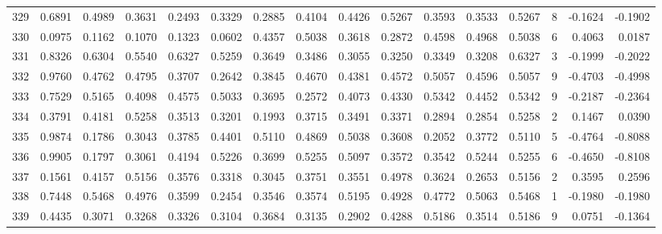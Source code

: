 \begin{tabular}{lrrrrrrrrrrrrrrr}
329 &      0.6891 &  0.4989 &  0.3631 &  0.2493 &  0.3329 &  0.2885 &  0.4104 &  0.4426 &  0.5267 &  0.3593 &   0.3533 &     0.5267 &      8 &                   -0.1624 &                    -0.1902 \\
330 &      0.0975 &  0.1162 &  0.1070 &  0.1323 &  0.0602 &  0.4357 &  0.5038 &  0.3618 &  0.2872 &  0.4598 &   0.4968 &     0.5038 &      6 &                    0.4063 &                     0.0187 \\
331 &      0.8326 &  0.6304 &  0.5540 &  0.6327 &  0.5259 &  0.3649 &  0.3486 &  0.3055 &  0.3250 &  0.3349 &   0.3208 &     0.6327 &      3 &                   -0.1999 &                    -0.2022 \\
332 &      0.9760 &  0.4762 &  0.4795 &  0.3707 &  0.2642 &  0.3845 &  0.4670 &  0.4381 &  0.4572 &  0.5057 &   0.4596 &     0.5057 &      9 &                   -0.4703 &                    -0.4998 \\
333 &      0.7529 &  0.5165 &  0.4098 &  0.4575 &  0.5033 &  0.3695 &  0.2572 &  0.4073 &  0.4330 &  0.5342 &   0.4452 &     0.5342 &      9 &                   -0.2187 &                    -0.2364 \\
334 &      0.3791 &  0.4181 &  0.5258 &  0.3513 &  0.3201 &  0.1993 &  0.3715 &  0.3491 &  0.3371 &  0.2894 &   0.2854 &     0.5258 &      2 &                    0.1467 &                     0.0390 \\
335 &      0.9874 &  0.1786 &  0.3043 &  0.3785 &  0.4401 &  0.5110 &  0.4869 &  0.5038 &  0.3608 &  0.2052 &   0.3772 &     0.5110 &      5 &                   -0.4764 &                    -0.8088 \\
336 &      0.9905 &  0.1797 &  0.3061 &  0.4194 &  0.5226 &  0.3699 &  0.5255 &  0.5097 &  0.3572 &  0.3542 &   0.5244 &     0.5255 &      6 &                   -0.4650 &                    -0.8108 \\
337 &      0.1561 &  0.4157 &  0.5156 &  0.3576 &  0.3318 &  0.3045 &  0.3751 &  0.3551 &  0.4978 &  0.3624 &   0.2653 &     0.5156 &      2 &                    0.3595 &                     0.2596 \\
338 &      0.7448 &  0.5468 &  0.4976 &  0.3599 &  0.2454 &  0.3546 &  0.3574 &  0.5195 &  0.4928 &  0.4772 &   0.5063 &     0.5468 &      1 &                   -0.1980 &                    -0.1980 \\
339 &      0.4435 &  0.3071 &  0.3268 &  0.3326 &  0.3104 &  0.3684 &  0.3135 &  0.2902 &  0.4288 &  0.5186 &   0.3514 &     0.5186 &      9 &                    0.0751 &                    -0.1364 \\

\end{tabular}
